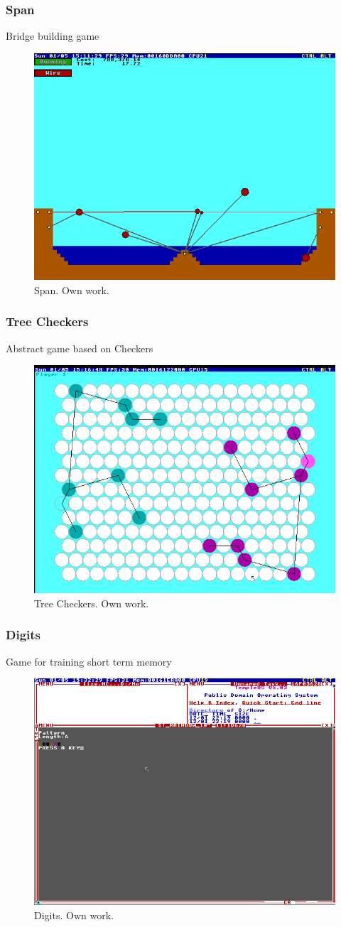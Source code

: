 \documentclass{beamer}
\begin{document}
	\begin{frame}
		\frametitle{Span}
		Bridge building game
		\begin{figure}
			\centering
			\includegraphics[width=0.6\linewidth]{images/span.png}
			\caption{Span. Own work.}
			\label{fig:span}
		\end{figure}
	\end{frame}

	\begin{frame}
		\frametitle{Tree Checkers}
		Abstract game based on Checkers
		\begin{figure}
			\centering
			\includegraphics[width=0.6\linewidth]{images/tree_checkers.png}
			\caption{Tree Checkers. Own work.}
			\label{fig:tree_checkers}
		\end{figure}
	\end{frame}

	\begin{frame}
		\frametitle{Digits}
		Game for training short term memory
		\begin{figure}
			\centering
			\includegraphics[width=0.6\linewidth]{images/digits.png}
			\caption{Digits. Own work.}
			\label{fig:digits}
		\end{figure}
	\end{frame}
\end{document}
